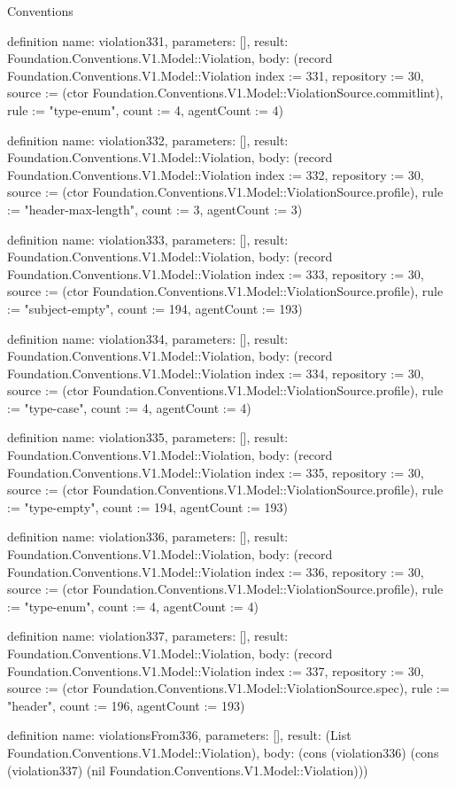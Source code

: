 \begin{lexlean}{Conventions}
\begin{semanticmodule}
definition{
  name: violation331,
  parameters: [],
  result: Foundation.Conventions.V1.Model::Violation,
  body: (record Foundation.Conventions.V1.Model::Violation {index := 331, repository := 30, source := (ctor Foundation.Conventions.V1.Model::ViolationSource.commitlint), rule := "type-enum", count := 4, agentCount := 4})
}

definition{
  name: violation332,
  parameters: [],
  result: Foundation.Conventions.V1.Model::Violation,
  body: (record Foundation.Conventions.V1.Model::Violation {index := 332, repository := 30, source := (ctor Foundation.Conventions.V1.Model::ViolationSource.profile), rule := "header-max-length", count := 3, agentCount := 3})
}

definition{
  name: violation333,
  parameters: [],
  result: Foundation.Conventions.V1.Model::Violation,
  body: (record Foundation.Conventions.V1.Model::Violation {index := 333, repository := 30, source := (ctor Foundation.Conventions.V1.Model::ViolationSource.profile), rule := "subject-empty", count := 194, agentCount := 193})
}

definition{
  name: violation334,
  parameters: [],
  result: Foundation.Conventions.V1.Model::Violation,
  body: (record Foundation.Conventions.V1.Model::Violation {index := 334, repository := 30, source := (ctor Foundation.Conventions.V1.Model::ViolationSource.profile), rule := "type-case", count := 4, agentCount := 4})
}

definition{
  name: violation335,
  parameters: [],
  result: Foundation.Conventions.V1.Model::Violation,
  body: (record Foundation.Conventions.V1.Model::Violation {index := 335, repository := 30, source := (ctor Foundation.Conventions.V1.Model::ViolationSource.profile), rule := "type-empty", count := 194, agentCount := 193})
}

definition{
  name: violation336,
  parameters: [],
  result: Foundation.Conventions.V1.Model::Violation,
  body: (record Foundation.Conventions.V1.Model::Violation {index := 336, repository := 30, source := (ctor Foundation.Conventions.V1.Model::ViolationSource.profile), rule := "type-enum", count := 4, agentCount := 4})
}

definition{
  name: violation337,
  parameters: [],
  result: Foundation.Conventions.V1.Model::Violation,
  body: (record Foundation.Conventions.V1.Model::Violation {index := 337, repository := 30, source := (ctor Foundation.Conventions.V1.Model::ViolationSource.spec), rule := "header", count := 196, agentCount := 193})
}

definition{
  name: violationsFrom336,
  parameters: [],
  result: (List Foundation.Conventions.V1.Model::Violation),
  body: (cons (violation336) (cons (violation337) (nil Foundation.Conventions.V1.Model::Violation)))
}


\end{semanticmodule}
\end{lexlean}
